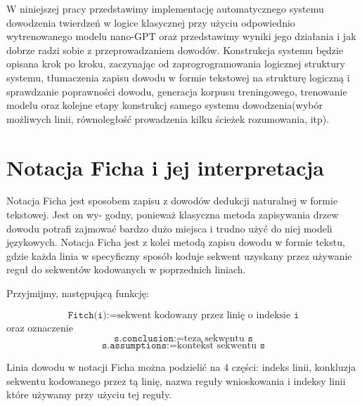 \documentclass{article}
\begin{document}
W niniejszej pracy przedstawimy implementację automatycznego systemu dowodzenia twierdzeń w logice klasycznej przy użyciu odpowiednio 
wytrenowanego modelu nano-GPT oraz przedstawimy wyniki jego działania i jak dobrze radzi sobie z przeprowadzaniem dowodów. Konstrukcja
systemu będzie opisana krok po kroku, zaczynając od zaprogrogramowania logicznej struktury systemu, tłumaczenia zapisu dowodu w formie 
tekstowej na strukturę logiczną i sprawdzanie poprawności dowodu, generacja korpusu treningowego, trenowanie modelu oraz 
kolejne etapy konstrukcj samego systemu dowodzenia(wybór możliwych linii, równoległość prowadzenia kilku ścieżek rozumowania, itp).

















\section{Notacja Ficha i jej interpretacja}

Notacja Ficha jest sposobem zapisu z dowodów dedukcji naturalnej w formie tekstowej. Jest on wy-
godny, ponieważ klasyczna metoda zapisywania drzew dowodu potrafi zajmować bardzo dużo miejsca
i trudno użyć do niej modeli językowych. Notacja Ficha jest z kolei metodą zapisu dowodu w formie tekstu, gdzie każda linia w specyficzny sposób koduje sekwent uzyskany przez używanie reguł do sekwentów kodowanych w poprzednich liniach.

Przyjmijmy, następującą funkcję:

$$\texttt{Fitch(i)} :=\text{sekwent kodowany przez linię o indeksie } \texttt{i}$$ 
oraz oznaczenie
$$\texttt{s.conclusion} := \text{teza sekwentu } \texttt{s}$$
$$\texttt{s.assumptions} := \text{kontekst sekwentu } \texttt{s}$$

Linia dowodu w notacji Ficha można podzielić na 4 części: indeks linii, konkluzja sekwentu kodowanego przez tą linię, nazwa reguły wnioskowania i indeksy linii które używamy przy użyciu tej reguły.
\end{document}
